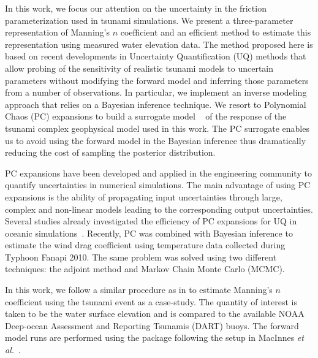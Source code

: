 In this work, we focus our attention on the uncertainty in the friction
parameterization used in tsunami simulations. We present a three-parameter 
representation of Manning's $n$ coefficient and an efficient method
to estimate this representation using measured water elevation data. The method proposed here 
is based on recent developments in Uncertainty Quantification (UQ) methods that allow 
probing of the sensitivity of realistic tsunami  models to uncertain parameters
without modifying the forward model and inferring those parameters
from a number of observations.  In particular, we implement an inverse modeling
approach that relies on a Bayesian inference technique.  We resort to
Polynomial Chaos (PC) expansions to build a surrogate model ~\cite{Najm:2009,Alexanderian2012,Elsheikh2014,Young2013}
of the response of the tsunami complex geophysical model \geoclaw used in this work.
The PC surrogate enables us to avoid using the forward model in
the Bayesian inference thus dramatically reducing the cost of sampling the
posterior distribution.

PC expansions have been developed and applied in the engineering community to
quantify uncertainties in numerical simulations.  The main advantage of
using PC expansions is the ability of propagating input uncertainties through 
large, complex and non-linear models leading to the corresponding output uncertainties. 
Several studies already investigated the efficiency of PC expansions for 
UQ in oceanic simulations~\citep{thacker2012,ashwanth2010,Alexanderian2012,sraj:2013a}. 
Recently, PC was combined with Bayesian inference to estimate the wind drag coefficient 
using temperature data collected during Typhoon Fanapi 2010. The same problem was 
solved using two different techniques: the adjoint method and Markov Chain Monte Carlo
(MCMC)\cite{sraj:2013a,sraj:2013b}.

In this work, we follow a similar procedure as in \cite{sraj:2013a,sraj:2013b}
to estimate Manning's $n$ coefficient using the \tohoku tsunami
event as a case-study. The quantity of interest is taken to be the water surface
elevation and is compared to the available NOAA Deep-ocean Assessment and
Reporting Tsunamis (DART) buoys.  The forward model runs are performed using the
\geoclaw package following the setup in MacInnes \emph{et al.}~\cite{MacInnes:2013cr}.

